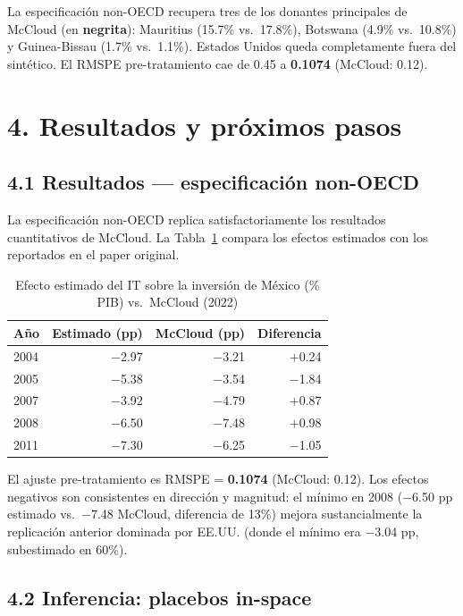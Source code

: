 \documentclass[11pt,a4paper]{article}
\begin{document}
La especificación non-OECD recupera tres de los donantes principales de McCloud (en \textbf{negrita}): Mauritius (15.7\% vs.\ 17.8\%), Botswana (4.9\% vs.\ 10.8\%) y Guinea-Bissau (1.7\% vs.\ 1.1\%). Estados Unidos queda completamente fuera del sintético. El RMSPE pre-tratamiento cae de 0.45 a \textbf{0.1074} (McCloud: 0.12).

\section*{4. Resultados y próximos pasos}

\subsection*{4.1 Resultados — especificación non-OECD}

La especificación non-OECD replica satisfactoriamente los resultados cuantitativos de McCloud. La Tabla~\ref{tab:efectos} compara los efectos estimados con los reportados en el paper original.

\begin{table}[H]
\centering
\footnotesize
\caption{Efecto estimado del IT sobre la inversión de México (\% PIB) vs.\ McCloud (2022)}
\label{tab:efectos}
\begin{tabular}{@{} l r r r @{}}
\toprule
\textbf{Año} & \textbf{Estimado (pp)} & \textbf{McCloud (pp)} & \textbf{Diferencia} \\
\midrule
2004 & $-$2.97 & $-$3.21 & $+$0.24 \\
2005 & $-$5.38 & $-$3.54 & $-$1.84 \\
2007 & $-$3.92 & $-$4.79 & $+$0.87 \\
2008 & $-$6.50 & $-$7.48 & $+$0.98 \\
2011 & $-$7.30 & $-$6.25 & $-$1.05 \\
\bottomrule
\end{tabular}
\end{table}

El ajuste pre-tratamiento es RMSPE = \textbf{0.1074} (McCloud: 0.12). Los efectos negativos son consistentes en dirección y magnitud: el mínimo en 2008 ($-$6.50 pp estimado vs.\ $-$7.48 McCloud, diferencia de 13\%) mejora sustancialmente la replicación anterior dominada por EE.UU. (donde el mínimo era $-$3.04 pp, subestimado en 60\%).

\subsection*{4.2 Inferencia: placebos in-space}
\end{document}
